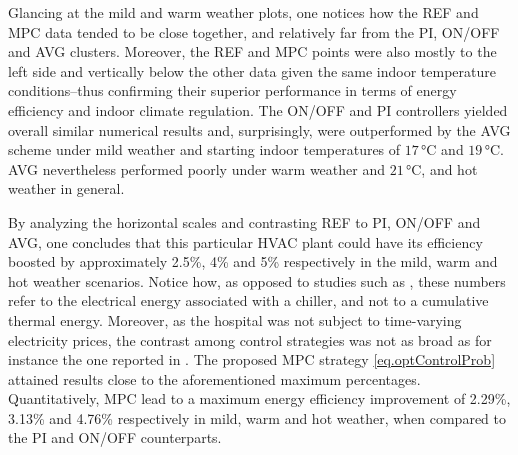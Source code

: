 Glancing at the mild and warm weather plots, one notices how the REF and MPC data tended to be close together, and relatively far from the PI, ON/OFF and AVG clusters. Moreover, the REF and MPC points were also mostly to the left side and vertically below the other data given the same indoor temperature conditions--thus confirming their superior performance in terms of energy efficiency and indoor climate regulation. The ON/OFF and PI controllers yielded overall similar numerical results and, surprisingly, were outperformed by the AVG scheme under mild weather and starting indoor temperatures of $17\,$°C and $19\,$°C. AVG nevertheless performed poorly under warm weather and $21\,$°C, and hot weather in general. 

By analyzing the horizontal scales and contrasting REF to PI, ON/OFF and AVG, one concludes that this particular HVAC plant could have its efficiency boosted by approximately 2.5\%, 4\% and 5\% respectively in the mild, warm and hot weather scenarios. Notice how, as opposed to studies such as \cite{bunning2020experimental}, these numbers refer to the electrical energy associated with a chiller, and not to a cumulative thermal energy. Moreover, as the hospital was not subject to time-varying electricity prices, the contrast among control strategies was not as broad as for instance the one reported in \cite{joe2022investigation}. The proposed MPC strategy \eqref{eq.optControlProb} attained results close to the aforementioned maximum percentages. Quantitatively, MPC lead to a maximum energy efficiency improvement of 2.29\%, 3.13\% and 4.76\% respectively in mild, warm and hot weather, when compared to the PI and ON/OFF counterparts.
